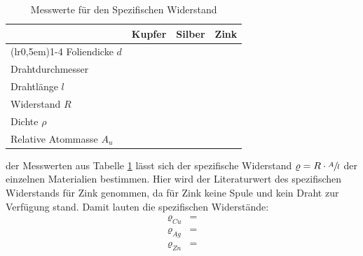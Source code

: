 \begin{table}[H]
\centering
    \begin{tabular}{l r r r}
    \toprule
        \multicolumn{1}{c}{} & \multicolumn{1}{c}{Kupfer} & \multicolumn{1}{c}{Silber} & \multicolumn{1}{c}{Zink}\\
        \cmidrule(lr{0,5em}){1-4}
        Foliendicke $d$        & \text{}   & \text{}   & \text{}\\
        Drahtdurchmesser    & \text{}   & \text{}   & \text{}\\
        Drahtlänge $l$         & \text{}         & \text{}         & \text{}\\
        Widerstand $R$         & \text{}         & \text{}         & \text{}\\
        Dichte  $\rho$            & \text{}    & \text{}    & \text{}\\
        Relative Atommasse $A_u$      & \text{} & \text{} & \text{}\\
        \bottomrule
    \end{tabular}
\caption{Messwerte für den Spezifischen Widerstand}
\label{tab:1}
\end{table}

\justifying der Messwerten aus Tabelle \ref{tab:1} lässt sich der spezifische Widerstand $\varrho = R \cdot \sfrac{A}{l}$
der einzelnen Materialien bestimmen. Hier wird der Literaturwert des spezifischen Widerstands für Zink \cite{SpWiderstand_Zn} genommen, da für 
Zink keine Spule und kein Draht zur Verfügung stand. Damit lauten die spezifischen Widerstände:
\begin{subequations} \label{eq:15}
\begin{align}
    \varrho_{Cu} &= \text{} \label{eq:15a}\\
    \varrho_{Ag} &= \text{} \label{eq:15b}\\
    \varrho_{Zn} &= \text{} \label{eq:15c}
\end{align}
\end{subequations}


